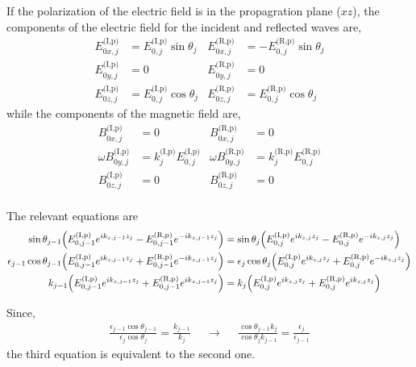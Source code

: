 If the polarization of the electric field is in the propagration plane ($xz$), the components of the electric field for the incident and reflected waves are,
\begin{align*}
	E^{\text{(I,p)}}_{0x,j} & = E^{\text{(I,p)}}_{0,j}\sin\theta_j & E^{\text{(R,p)}}_{0x,j} & = -E^{\text{(R,p)}}_{0,j}\sin\theta_j \\
	E^{\text{(I,p)}}_{0y,j} & = 0                                  & E^{\text{(R,p)}}_{0y,j} & = 0                                   \\
	E^{\text{(I,p)}}_{0z,j} & = E^{\text{(I,p)}}_{0,j}\cos\theta_j & E^{\text{(R,p)}}_{0z,j} & = E^{\text{(R,p)}}_{0,j}\cos\theta_j
\end{align*} while the components of the magnetic field are,
\begin{align*}
	B^{\text{(I,p)}}_{0x,j}        & = 0                                        & B^{\text{(R,p)}}_{0x,j}        & = 0                                        \\
	\omega B^{\text{(I,p)}}_{0y,j} & = k^{\text{(I,p)}}_jE^{\text{(I,p)}}_{0,j} & \omega B^{\text{(R,p)}}_{0y,j} & = k^{\text{(R,p)}}_jE^{\text{(R,p)}}_{0,j} \\
	B^{\text{(I,p)}}_{0z,j}        & = 0                                        & B^{\text{(R,p)}}_{0z,j}        & = 0                                        \\
\end{align*}

The relevant equations are
\begin{align*}
	\sin\theta_{j-1}\pqty{E^{\text{(I,p)}}_{0,j-1}e^{ik_{z,j-1}z_j} - E^{\text{(R,p)}}_{0,j-1}e^{-ik_{z,j-1}z_j}}                 & =
	\sin\theta_{j}\pqty{E^{\text{(I,p)}}_{0,j}e^{ik_{z,j}z_j} - E^{\text{(R,p)}}_{0,j}e^{-ik_{z,j}z_j}}
	\\
	\epsilon_{j-1} \cos\theta_{j-1} \pqty{E^{\text{(I,p)}}_{0,j-1}e^{ik_{z,j-1}z_j} + E^{\text{(R,p)}}_{0,j-1}e^{-ik_{z,j-1}z_j}} & =
	\epsilon_{j} \cos\theta_{j} \pqty{E^{\text{(I,p)}}_{0,j}e^{ik_{z,j}z_j} + E^{\text{(R,p)}}_{0,j} e^{-ik_{z,j}z_j}}
	\\
	k_{j-1}\pqty{E^{\text{(I,p)}}_{0,j-1} e^{ik_{z,j-1}z_j} + E^{\text{(R,p)}}_{0,j-1} e^{ik_{z,j-1}z_j}}                         & =
	k_{j}\pqty{E^{\text{(I,p)}}_{0,j} e^{ik_{z,j}z_j} + E^{\text{(R,p)}}_{0,j} e^{ik_{z,j}z_j}}
\end{align*}

Since,
\begin{align*}
	\frac{\epsilon_{j-1} \cos\theta_{j-1}}{\epsilon_{j} \cos\theta_{j}} = \frac{k_{j-1}}{k_{j}} &  & \to &  &
	\frac{ \cos\theta_{j-1} k_{j}}{ \cos\theta_{j} k_{j-1}} = \frac{\epsilon_{j}}{\epsilon_{j-1}}
\end{align*}
the third equation is equivalent to the second one.

